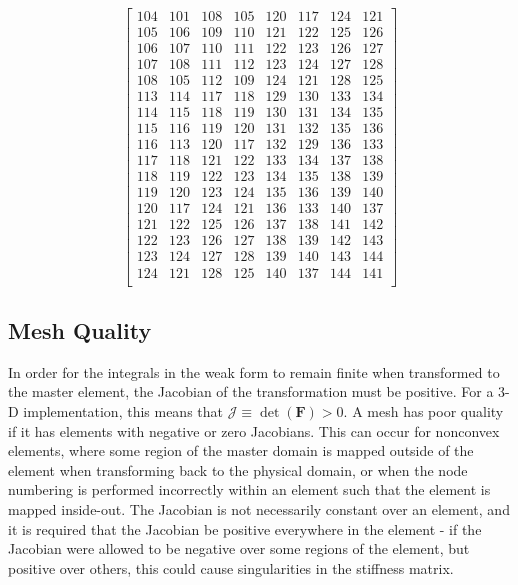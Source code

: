 \documentclass[10pt]{article}
\begin{document}
\begin{equation}
\begin{bmatrix}
104 & 101 & 108 & 105 & 120 & 117 & 124 & 121\\
105 & 106 & 109 & 110 & 121 & 122 & 125 & 126\\
106 & 107 & 110 & 111 & 122 & 123 & 126 & 127\\
107 & 108 & 111 & 112 & 123 & 124 & 127 & 128\\
108 & 105 & 112 & 109 & 124 & 121 & 128 & 125\\
113 & 114 & 117 & 118 & 129 & 130 & 133 & 134\\
114 & 115 & 118 & 119 & 130 & 131 & 134 & 135\\
115 & 116 & 119 & 120 & 131 & 132 & 135 & 136\\
116 & 113 & 120 & 117 & 132 & 129 & 136 & 133\\
117 & 118 & 121 & 122 & 133 & 134 & 137 & 138\\
118 & 119 & 122 & 123 & 134 & 135 & 138 & 139\\
119 & 120 & 123 & 124 & 135 & 136 & 139 & 140\\
120 & 117 & 124 & 121 & 136 & 133 & 140 & 137\\
121 & 122 & 125 & 126 & 137 & 138 & 141 & 142\\
122 & 123 & 126 & 127 & 138 & 139 & 142 & 143\\
123 & 124 & 127 & 128 & 139 & 140 & 143 & 144\\
124 & 121 & 128 & 125 & 140 & 137 & 144 & 141\\
\end{bmatrix}
\end{equation}

\subsection{Mesh Quality}

In order for the integrals in the weak form to remain finite when transformed to the master element, the Jacobian of the transformation must be positive. For a 3-D implementation, this means that \(\mathscr{J}\equiv\det{(\textbf{F})}>0\). A mesh has poor quality if it has elements with negative or zero Jacobians. This can occur for nonconvex elements, where some region of the master domain is mapped outside of the element when transforming back to the physical domain, or when the node numbering is performed incorrectly within an element such that the element is mapped inside-out. The Jacobian is not necessarily constant over an element, and it is required that the Jacobian be positive everywhere in the element - if the Jacobian were allowed to be negative over some regions of the element, but positive over others, this could cause singularities in the stiffness matrix.
\end{document}
